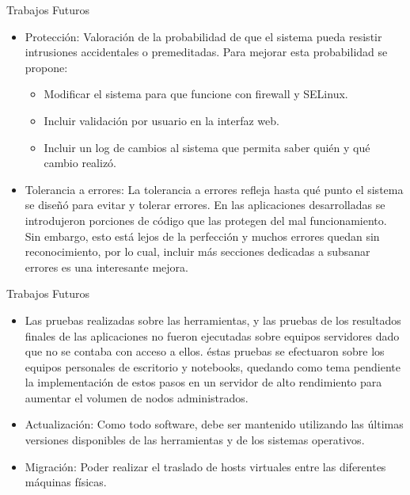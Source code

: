 \documentclass{beamer}
\begin{document}
\begin{frame}{Trabajos Futuros}
\vspace{-1.5cm}
\begin{itemize}
    \item Protección: Valoración de la probabilidad de que el sistema pueda resistir intrusiones accidentales o premeditadas. Para mejorar esta probabilidad se propone:
    \begin{itemize}
        \item  Modificar el sistema para que funcione con firewall y SELinux.

        \item  Incluir validación por usuario en la interfaz web. 

        \item  Incluir un log de cambios al sistema que permita saber quién y qué cambio realizó.
    \end{itemize}
    \item Tolerancia a errores: La tolerancia a errores refleja hasta qué punto el sistema se diseñó para evitar y tolerar errores. En las aplicaciones desarrolladas se introdujeron porciones de código que las protegen del mal funcionamiento. Sin embargo, esto está lejos de la perfección y muchos errores quedan sin reconocimiento, por lo cual, incluir más secciones dedicadas a subsanar errores es una interesante mejora.

    
\end{itemize}

\end{frame}


\begin{frame}{Trabajos Futuros}
\vspace{-1.5cm}
\begin{itemize}
\item Las pruebas realizadas sobre las herramientas, y las pruebas de los resultados finales de las aplicaciones no fueron ejecutadas sobre equipos servidores dado que no se contaba con acceso a ellos. éstas pruebas se efectuaron sobre los equipos personales de escritorio y notebooks, quedando como tema pendiente la implementación de estos pasos en un servidor de alto rendimiento para aumentar el volumen de nodos administrados. 

\item Actualización: Como todo software, debe ser mantenido utilizando las últimas versiones disponibles de las herramientas y de los sistemas operativos.

\item Migración: Poder realizar el traslado de hosts virtuales entre las diferentes máquinas físicas.
\end{itemize}

\end{frame}
\end{document}
